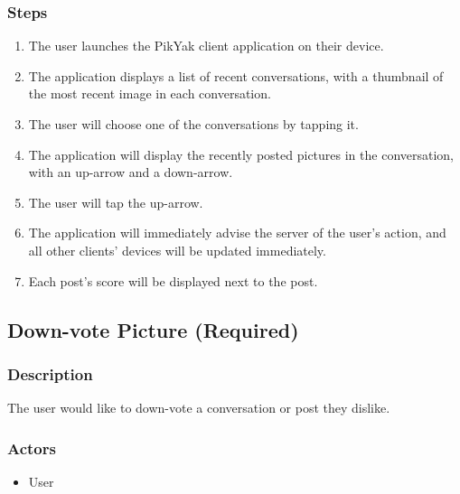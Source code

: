 \documentclass[11pt]{scrartcl}
\begin{document}
        \subsubsection{Steps}
            \begin{enumerate}
                \item The user launches the PikYak client application on their device.
                \item The application displays a list of recent conversations, with a thumbnail of the most recent image in each conversation.
                \item The user will choose one of the conversations by tapping it.
                \item The application will display the recently posted pictures in the conversation, with an up-arrow and a down-arrow.
                \item The user will tap the up-arrow.
                \item The application will immediately advise the server of the user's action, and all other clients' devices will be updated immediately.
                \item Each post's score will be displayed next to the post.
            \end{enumerate}

    \subsection{Down-vote Picture (Required)}
    \label{sec:downvote}
        \subsubsection{Description}
            The user would like to down-vote a conversation or post they dislike.
        \subsubsection{Actors}
            \begin{itemize}
                \item User
            \end{itemize}
\end{document}
